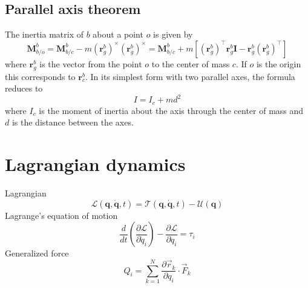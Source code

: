 \subsection{Parallel axis theorem}
The inertia matrix of $b$ about a point $o$ is given by
\begin{equation}
    \mathbf{M}_{b/o}^b = \mathbf{M}_{b/c}^b - m (\mathbf{r}_g^b)^\times (\mathbf{r}_g^b)^\times =
    \mathbf{M}_{b/c}^b + m\left[ (\mathbf{r}_g^b)^\top \mathbf{r}_g^b \mathbf{I} - \mathbf{r}_g^b (\mathbf{r}_g^b)^\top \right]
\end{equation}
where $\mathbf{r}_g^b$ is the vector from the point $o$ to the center of mass $c$. If $o$ is the origin this corresponds to $\mathbf{r}_c^b$. In its simplest form with two parallel axes, the formula reduces to
\begin{equation}
    I = I_c + md^2
\end{equation}
where $I_c$ is the moment of inertia about the axis through the center of mass and $d$ is the distance between the axes.
\section{Lagrangian dynamics}
Lagrangian
\begin{equation}
    \mathcal{L}(\mathbf{q, \dot{q}}, t) = \mathcal{T}(\mathbf{q, \dot{q}}, t) - \mathcal{U}(\mathbf{q})
\end{equation}
Lagrange's equation of motion
\begin{equation}
    \frac{d}{dt} \left( \frac{\partial \mathcal{L}}{\partial \dot{q}_i} \right) - \frac{\partial \mathcal{L}}{\partial q_i} = \tau_i
\end{equation}
Generalized force
\begin{equation}
    Q_i = \sum_{k=1}^N \frac{\partial \vec{r}_k}{\partial q_i} \cdot \vec{F}_k
\end{equation}
